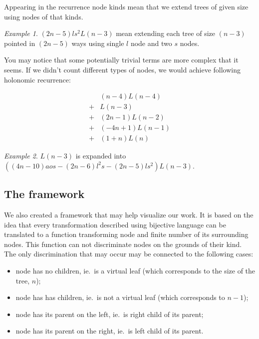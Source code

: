 \documentclass[final]{article}
\theoremstyle{definition}
\theoremstyle{remark}
\newtheorem{example}{Example}[subsection]
\begin{document}
Appearing in the recurrence node kinds mean that we extend trees of given size using nodes of that kinds.

\begin{example}
    \((2n - 5) l s^2 L(n - 3)\) mean extending each tree of size \((n - 3)\) pointed in \((2n - 5)\) ways using single \(l\) node and two \(s\) nodes.
\end{example}

You may notice that some potentially trivial terms are more complex that it seems. If we didn't count different types of nodes, we would achieve following holonomic recurrence:

\[\begin{array}{rl}
        & (n - 4) L(n - 4)\\
        +& L(n - 3)\\
        +& (2 n - 1) L(n - 2)\\
        +& (-4 n + 1) L(n - 1)\\
        +& (1 + n) L(n)
\end{array}\]

\begin{example}
    \(L(n-3)\) is expanded into \(((4 n - 10) a o s - (2 n - 6) l^2 s - (2 n - 5) l s^2) L(n - 3)\).
\end{example}


\subsection{The framework}%
\label{sub:the_framework}

We also created a framework that may help visualize our work. It is based on the idea that every transformation described using bijective language can be translated to a function transforming node and finite number of its surrounding nodes. This function can not discriminate nodes on the grounds of their kind. The only discrimination that may occur may be connected to the following cases:
\begin{itemize}
    \item node has no children, ie.~is a virtual leaf (which corresponds to the size of the tree, \(n\));
    \item node has has children, ie.~is not a virtual leaf (which corresponds to \(n - 1\));
    \item node has its parent on the left, ie.~is right child of its parent;
    \item node has its parent on the right, ie.~is left child of its parent.
\end{itemize}
\end{document}
